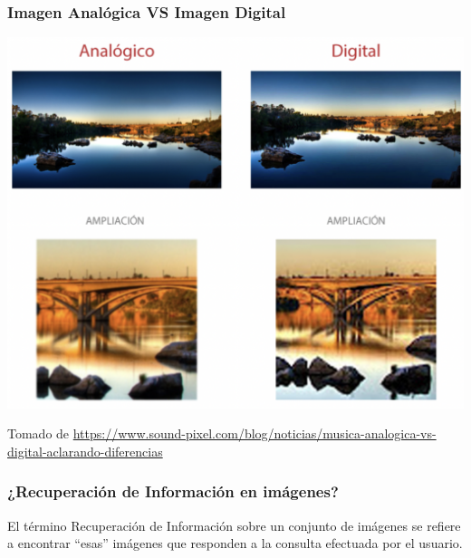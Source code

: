 \documentclass[
10pt, %
aspectratio=169, %
]{beamer}
\begin{document}
	\begin{frame}
		
		\frametitle{Imagen Analógica VS Imagen Digital}
		
		\centering
		\includegraphics[scale=0.34]{diferencias.png} 
		
		{\scriptsize Tomado de \url{https://www.sound-pixel.com/blog/noticias/musica-analogica-vs-digital-aclarando-diferencias}}
		
	\end{frame}
	
	\begin{frame}
		
		\frametitle{¿Recuperación de Información en imágenes?}
		
		El término Recuperación de Información sobre un conjunto de imágenes se refiere a encontrar ``esas'' imágenes que responden a la consulta efectuada por el usuario.
		
	\end{frame}
	
\end{document}
